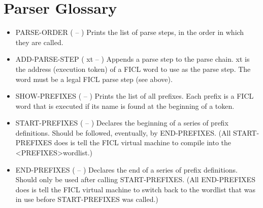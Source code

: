 \section{Parser Glossary}
\begin{itemize}[noitemsep]
	\item PARSE-ORDER ( -- )\newline
	Prints the list of parse steps, in the order in which they are
	called.

	\item ADD-PARSE-STEP ( xt -- )\newline
	Appends a parse step to the parse chain. xt is the address
	(execution token) of a FICL word to use as the parse step. The
	word must be a legal FICL parse step (see above).

	\item SHOW-PREFIXES ( -- )\newline
	Prints the list of all prefixes. Each prefix is a FICL word that
	is executed if its name is found at the beginning of a token.

	\item START-PREFIXES ( -- )\newline
	Declares the beginning of a series of prefix definitions. Should
	be followed, eventually, by END-PREFIXES. (All START-PREFIXES
	does is tell the FICL virtual machine to compile into the
	\textless PREFIXES\textgreater  wordlist.)

	\item END-PREFIXES ( -- )\newline
	Declares the end of a series of prefix definitions. Should only
	be used after calling START-PREFIXES. (All END-PREFIXES does is
	tell the FICL virtual machine to switch back to the wordlist
	that was in use before START-PREFIXES was called.)
\end{itemize}
